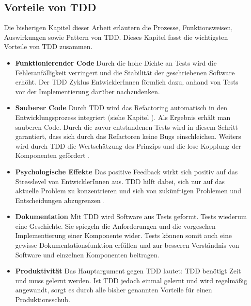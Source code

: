 \subsection{Vorteile von TDD}
\label{Vorteile von TDD}
Die bisherigen Kapitel dieser Arbeit erläutern die Prozesse, Funktionsweisen, Auswirkungen sowie Pattern von TDD. Dieses Kapitel fasst die wichtigsten Vorteile von TDD zusammen.
\begin{itemize}
  \item \textbf{Funktionierender Code}\newline
  Durch die hohe Dichte an Tests wird die Fehleranfälligkeit verringert und die Stabilität der geschriebenen Software erhöht. Der TDD Zyklus  EntwicklerInnen förmlich dazu, anhand von Tests vor der Implementierung darüber nachzudenken.
  \item \textbf{Sauberer Code}\newline
  Durch TDD wird das Refactoring automatisch in den Entwicklungsprozess integriert (siehe Kapitel ). Als Ergebnis erhält man sauberen Code. Durch die zuvor entstandenen Tests wird in diesem Schritt garantiert, dass sich durch das Refactoren keine Bugs einschleichen. Weiters wird durch TDD die Wertschätzung des  Prinzips und die lose Kopplung der Komponenten gefördert \autocite[30]{Johansen:2011}.
  \item \textbf{Psychologische Effekte}\newline
  Das positive Feedback wirkt sich positiv auf das Stresslevel von EntwicklerInnen aus.
  TDD hilft dabei, sich nur auf das aktuelle Problem zu konzentrieren und sich von zukünftigen Problemen und Entscheidungen abzugrenzen \autocite{Beck:2003}.
  \item \textbf{Dokumentation}\newline
  Mit TDD wird Software aus Tests geformt. Tests wiederum  eine Geschichte. Sie spiegeln die Anforderungen und die vorgesehen Implementierung einer Komponente wider. Tests können somit auch eine gewisse Dokumentationsfunktion erfüllen und zur besseren Verständnis von Software und einzelnen Komponenten beitragen.
  \item \textbf{Produktivität}\newline
  Das Hauptargument gegen TDD lautet: TDD benötigt Zeit und muss gelernt werden.
  Ist TDD jedoch einmal gelernt und wird regelmäßig angewandt, sorgt es durch alle bisher genannten Vorteile für einen Produktionsschub.
\end{itemize}

